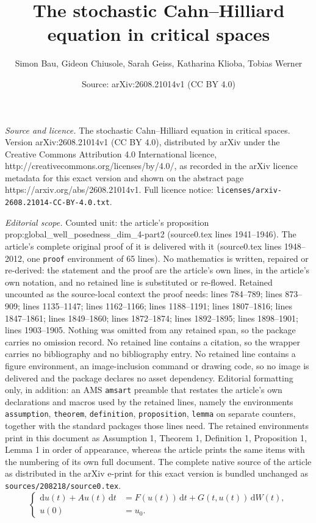 \documentclass[10pt,a4paper]{amsart}
\title{The stochastic Cahn--Hilliard equation in critical spaces}
\author{Simon Bau, Gideon Chiusole, Sarah Geiss, Katharina Klioba, Tobias Werner}
\date{Source: arXiv:2608.21014v1 (CC BY 4.0)}
\newcommand{\dd}{\ensuremath{\mathrm{d}}}
\newcommand{\dt}{\,\mathrm{d}t}
\begin{document}
\maketitle

\noindent\emph{Source and licence.} The stochastic Cahn--Hilliard equation in critical spaces. Version arXiv:2608.21014v1 (CC BY 4.0), distributed by arXiv under the Creative Commons Attribution 4.0 International licence, http://creativecommons.org/licenses/by/4.0/, as recorded in the arXiv licence metadata for this exact version and shown on the abstract page https://arxiv.org/abs/2608.21014v1. Full licence notice: \texttt{licenses/arxiv-2608.21014-CC-BY-4.0.txt}.\par\smallskip

\noindent\textit{Editorial scope.} Counted unit: the article's proposition prop:global\_well\_posedness\_dim\_4-part2 (source0.tex lines 1941--1946). The article's complete original proof of it is delivered with it (source0.tex lines 1948--2012, one \texttt{proof} environment of 65 lines). No mathematics is written, repaired or re-derived: the statement and the proof are the article's own lines, in the article's own notation, and no retained line is substituted or re-flowed.  Retained uncounted as the source-local context the proof needs: lines 784--789; lines 873--909; lines 1135--1147; lines 1162--1166; lines 1188--1191; lines 1807--1816; lines 1847--1861; lines 1849--1860; lines 1872--1874; lines 1892--1895; lines 1898--1901; lines 1903--1905.  Nothing was omitted from any retained span, so the package carries no omission record.  No retained line contains a citation, so the wrapper carries no bibliography and no bibliography entry.  No retained line contains a figure environment, an image-inclusion command or drawing code, so no image is delivered and the package declares no asset dependency.  Editorial formatting only, in addition: an AMS \texttt{amsart} preamble that restates the article's own declarations and macros used by the retained lines, namely the environments \texttt{assumption}, \texttt{theorem}, \texttt{definition}, \texttt{proposition}, \texttt{lemma} on separate counters, together with the standard packages those lines need.  The retained environments print in this document as Assumption 1, Theorem 1, Definition 1, Proposition 1, Lemma 1 in order of appearance, whereas the article prints the same items with the numbering of its own full document.  The complete native source of the article as distributed in the arXiv e-print for this exact version is bundled unchanged as \texttt{sources/208218/source0.tex}.
\begin{equation}\tag{AVP}\label{eq:AVP}
    \begin{cases}
        \dd u(t) + Au(t)\dt  &= F(u(t)) \dt + G(t,u(t))\,\dd W(t), \\
        u(0) &=u_0.
    \end{cases}
\end{equation}
\end{document}
